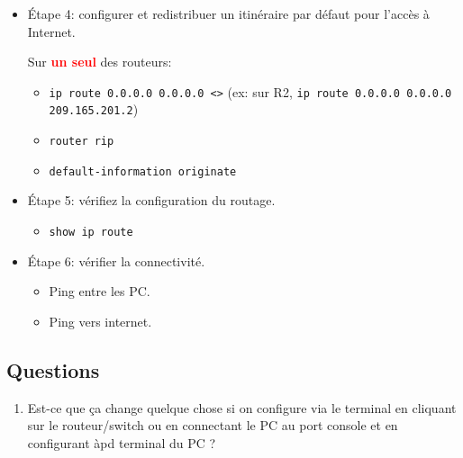 \documentclass[a4paper]{article}
\begin{document}
\begin{itemize}
\item Étape 4: configurer et redistribuer un itinéraire par défaut pour l'accès à Internet.
\begin{example}
    Sur \textcolor{red}{\textbf{un seul}} des routeurs:
    \begin{itemize}
        \item \texttt{ip route 0.0.0.0 0.0.0.0 <>} \qquad (ex: sur R2, \texttt{ip route 0.0.0.0 0.0.0.0 209.165.201.2})
        \item \texttt{router rip}
        \item \texttt{default-information originate}
    \end{itemize}
\end{example}





\item Étape 5: vérifiez la configuration du routage.
\begin{example}
    \begin{itemize}
        \item \texttt{show ip route}
    \end{itemize}
\end{example}





\item Étape 6: vérifier la connectivité.
\begin{example}
    \begin{itemize}
        \item Ping entre les PC.
        \item Ping vers internet.
    \end{itemize}
\end{example}





\end{itemize}










\subsection{Questions}





\begin{enumerate}

\item Est-ce que ça change quelque chose si on configure via le terminal en cliquant sur le routeur/switch ou en connectant le PC au port console et en configurant àpd terminal du PC ?

\end{enumerate}
\end{document}
